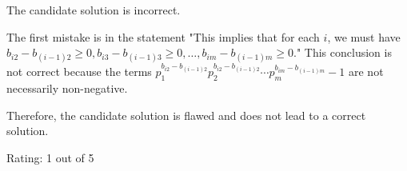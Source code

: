 The candidate solution is incorrect.

The first mistake is in the statement "This implies that for each \( i \), we must have \( b_{i2} - b_{(i-1)2} \geq 0, b_{i3} - b_{(i-1)3} \geq 0, \dots, b_{im} - b_{(i-1)m} \geq 0 \)." This conclusion is not correct because the terms \( p_1^{b_{i2}-b_{(i-1)2}} p_2^{b_{i2}-b_{(i-1)2}} \cdots p_m^{b_{im}-b_{(i-1)m}} - 1 \) are not necessarily non-negative. 

Therefore, the candidate solution is flawed and does not lead to a correct solution. 

Rating: 1 out of 5
